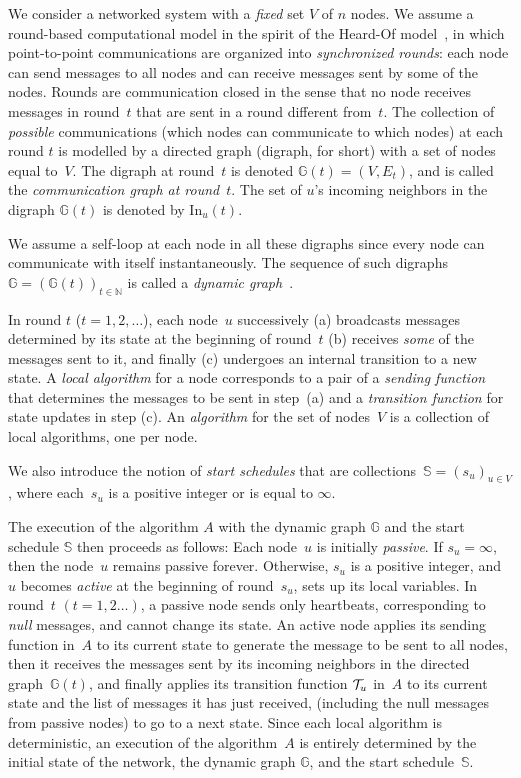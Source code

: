 \documentclass{article}
\newcommand{\dG}{\mathds{G}}
\newcommand{\IN}{\mathds{N}}
\newcommand{\IS}{\mathds{S}}
\newcommand{\In}{\mathrm{In}}
\begin{document}
We consider a networked system with a {\em fixed} set $V$ of $n$ nodes.
We assume a round-based computational model  in the spirit of the Heard-Of model~\cite{model_ho}, 
	in which point-to-point communications are organized into \emph{synchronized rounds}: 
	each node can send messages  to all nodes and can receive messages sent  by some of the nodes.
Rounds are communication closed in the sense that no node receives messages in round~$t$ that are sent 
	in a round different from~$t$. 
The collection of \emph{possible} communications (which nodes can communicate to which nodes) at each round $t$
	is modelled by a directed graph (digraph, for short) with a set of nodes equal to~$V$.
The digraph at round~$t$ is  denoted $\dG(t)=(V,E_t)$, and is called the \emph{communication graph at round}~$t$. 
The set of $u$'s incoming neighbors in the digraph $\dG(t)$ is denoted by $\In_u(t)$.

We assume a self-loop at each node in all these digraphs  since every node can communicate with 
	itself instantaneously.	
The sequence of such digraphs~$\dG=\left (\dG(t) \right )_{t\in\IN}$ is called a {\em dynamic graph}~\cite{time_varying_graph}. 

In round $t$ ($t = 1, 2 , \ldots $), each node~$ u $ successively
	(a) broadcasts  messages determined by its state at the beginning of round~$ t $
	(b) receives \emph{some} of the messages sent to it,
	and finally (c) undergoes an internal transition to a new state.
A  \emph{local algorithm} for a node corresponds to a pair of
	a \emph{sending function} that determines the messages to be sent in step~(a)
	and a \emph{transition function} for state updates in step (c).
An \emph{algorithm} for the set of nodes~$V$ is a collection of local algorithms, one per node.

We also introduce the notion of  \emph{start schedules}
	that are collections~$\IS= \left (s_u \right )_{u \in V}$,
	where each~$s_u$ is  a positive integer or is equal to $\infty$.

	
The execution of the algorithm $ A $  with the dynamic graph $\dG$ and the start schedule $\IS$ then proceeds
	as follows:
Each node~$u$ is initially  \emph{passive}. 
If $s_u = \infty$, then  the node~$u$ remains passive forever.
Otherwise, $s_u $ is a positive integer, and $u$ becomes {\em active} 
	at the beginning of round~$s_u$, sets up its local variables.
In  round~$t$ $(t = 1,2\dots)$, a passive  node
	sends only heartbeats, corresponding to  \emph{null} messages,  and  cannot change its state. 	
An active node 	applies its sending function in~$A$ to its current state to generate the message to be sent to all nodes,
	then it receives the messages sent by its incoming neighbors in the directed graph~$\dG(t)$, and finally 
	applies its transition function ${\cal T}_u$ in~$A$ to its current state and the list of messages it has just received,
	(including the null messages from passive nodes) to go to  a next state. 
Since each local algorithm is deterministic, an execution of the algorithm~$A$  is entirely determined 
	by the initial state of the network,  the dynamic graph $\dG$,
	and  the  start schedule~$\IS$.
	
\end{document}
